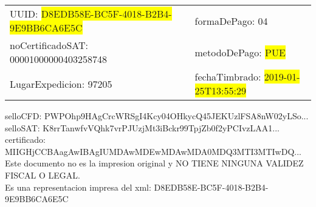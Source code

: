 \documentclass{article}
\begin{document}
\begin{tabular}{p{11cm}p{1cm}p{8cm}}
\bigskip
UUID: \colorbox{yellow}{ D8EDB58E-BC5F-4018-B2B4-9E9BB6CA6E5C } & & formaDePago: 04\\

noCertificadoSAT: 00001000000403258748 & & metodoDePago: \colorbox{yellow}{ PUE }\\

LugarExpedicion: 97205 & & fechaTimbrado: \colorbox{yellow}{ 2019-01-25T13:55:29 } \\
\end{tabular}

\bigskip
selloCFD: PWPOhp9HAgCrcWRSgI4Kcy04OHkycQ45JEKUzlFSA8nW02yLSo... \\
selloSAT: K8rrTanwfvVQhk7vrPJUzjMt3iBckr99TpjZb0f2yPCIvzLAA1... \\

certificado: MIIGHjCCBAagAwIBAgIUMDAwMDEwMDAwMDA0MDQ3MTI3MTIwDQ...\bigskip\bigskip\bigskip\bigskip\bigskip\bigskip
\\Este documento no es la impresion original y NO TIENE NINGUNA VALIDEZ FISCAL O LEGAL. \\
 Es una representacion impresa del xml:  D8EDB58E-BC5F-4018-B2B4-9E9BB6CA6E5C \\
\end{document}
